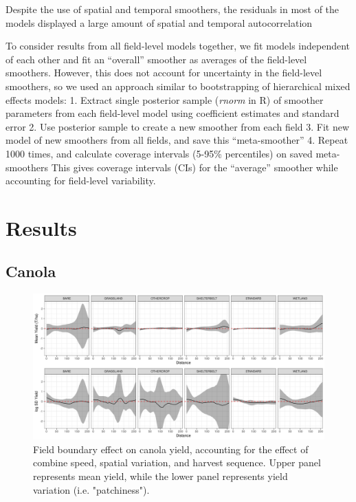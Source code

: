 \documentclass[]{elsarticle} %
\begin{document}
Despite the use of spatial and temporal smoothers, the residuals in most of the models displayed a large amount of spatial and temporal autocorrelation

To consider results from all field-level models together, we fit models independent of each other and fit an ``overall'' smoother as averages of the field-level smoothers.
However, this does not account for uncertainty in the field-level smoothers, so we used an approach similar to bootstrapping of hierarchical mixed effects models:
1. Extract single posterior sample (\emph{rnorm} in R) of smoother parameters from each field-level model using coefficient estimates and standard error
2. Use posterior sample to create a new smoother from each field
3. Fit new model of new smoothers from all fields, and save this ``meta-smoother''
4. Repeat 1000 times, and calculate coverage intervals (5-95\% percentiles) on saved meta-smoothers
This gives coverage intervals (CIs) for the ``average'' smoother while accounting for field-level variability.

\hypertarget{results}{%
\section{Results}\label{results}}

\hypertarget{canola}{%
\subsection{Canola}\label{canola}}

\begin{figure}
\includegraphics[width=1\linewidth]{../Figures/ModelSummary3a_canola} \caption{Field boundary effect on canola yield, accounting for the effect of combine speed, spatial variation, and harvest sequence. Upper panel represents mean yield, while the lower panel represents yield variation (i.e. "patchiness").}\label{fig:unnamed-chunk-1}
\end{figure}
\end{document}
